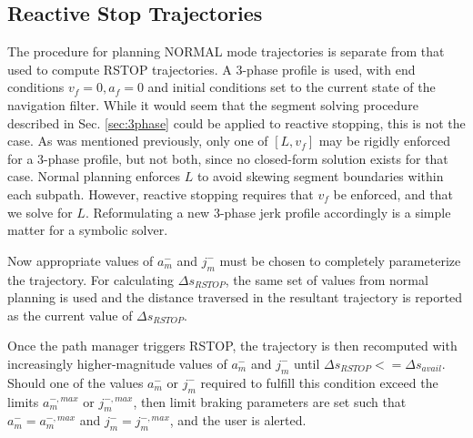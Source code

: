 \documentclass[letterpaper, 10 pt, conference]{ieeeconf}  %
\begin{document}


\subsection{Reactive Stop Trajectories} \label{sec:reactivestoptrajectory}

The procedure for planning NORMAL mode trajectories is separate from that used to compute RSTOP trajectories.
A 3-phase profile is used, with end conditions $v_f=0, a_f=0$ and initial conditions set to the current state of the navigation filter.
While it would seem that the segment solving procedure described in Sec. \ref{sec:3phase} could be applied to reactive stopping, this is not the case.
As was mentioned previously, only one of $[L, v_f]$ may be rigidly enforced for a 3-phase profile, but not both, since no closed-form solution exists for that case.
Normal planning enforces $L$ to avoid skewing segment boundaries within each subpath.
However, reactive stopping requires that $v_f$ be enforced, and that we solve for $L$.
Reformulating a new 3-phase jerk profile accordingly is a simple matter for a symbolic solver.

Now appropriate values of $a_m^-$ and $j_m^-$ must be chosen to completely parameterize the trajectory.
For calculating $\Delta s_{RSTOP}$, the same set of values from normal planning is used and the distance traversed in the resultant trajectory is reported as the current value of $\Delta s_{RSTOP}$.

Once the path manager triggers RSTOP, the trajectory is then recomputed with increasingly higher-magnitude values of $a_m^-$ and $j_m^-$ until $\Delta s_{RSTOP} <= \Delta s_{avail}$.
Should one of the values $a_m^-$ or $j_m^-$ required to fulfill this condition exceed the limits $a_m^{-,max}$ or $j_m^{-,max}$, then limit braking parameters are set such that $a_m^-=a_m^{-,max}$ and $j_m^-=j_m^{-,max}$, and the user is alerted.
\end{document}
